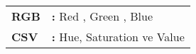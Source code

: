 \hspace{-3mm}
\begin{tabular}{p{2cm}l}
{\bf{RGB}} & {\bf:} Red , Green , Blue\\
{\bf CSV} & {\bf:} Hue, Saturation ve Value\\

\end{tabular}

